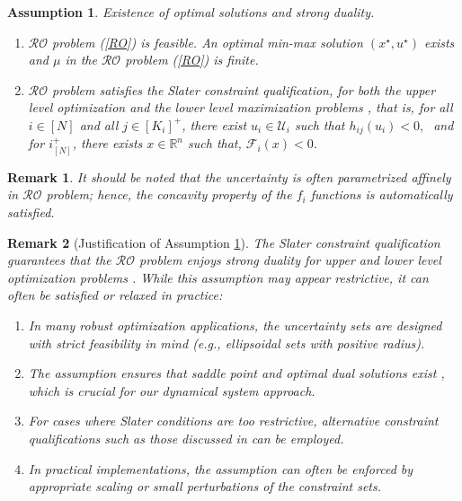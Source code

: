 \documentclass[journal,twoside,web]{ieeecolor}
\newcommand{\rev}[1]{\textcolor{revisionblue}{#1}}
\newtheorem{assumption}[theorem]{Assumption}
\newtheorem{remark}{Remark}
\begin{document}
\begin{assumption} \label{assume_feasible} Existence of optimal solutions and strong duality.

\begin{enumerate}
\item $\mathcal{RO}$ problem (\ref{RO}) is feasible. An optimal min-max solution $(x^\star,u^\star)$ exists and $\mu$ in the $\mathcal{RO}$ problem (\ref{RO}) is finite.
\item $\mathcal{RO}$ problem satisfies the Slater constraint qualification, for both the upper level optimization and the lower level maximization problems
 \cite{bental2009-2}, that is,
for all $i\in[N]$ and all $j\in[K_i]^+$, there exist $u_i \in \mathcal{U}_i$ such that $h_{ij}(u_i)<0,\;$  and
for $i^+_{[N]}$,  there exists $x \in \mathbb{R}^n$ such that, $\mathcal{F}_i(x)<0$\;.
\end{enumerate}
\end{assumption}
\begin{remark}
    It should be noted that the uncertainty is often parametrized affinely in $\mathcal{RO}$ problem; hence, the concavity property of the $f_i$ functions is automatically satisfied.
\end{remark}
\begin{remark}[\rev{Justification of Assumption \ref{assume_feasible}}] \label{strong_duality_rem}
\rev{The Slater constraint qualification guarantees that the $\mathcal{RO}$ problem enjoys strong duality for upper and lower level optimization problems \cite[Section~5.2.3, 5.9.1]{boyd2004}. While this assumption may appear restrictive, it can often be satisfied or relaxed in practice:}
\begin{enumerate}
\item \rev{In many robust optimization applications, the uncertainty sets are designed with strict feasibility in mind (e.g., ellipsoidal sets with positive radius).}
\item \rev{The assumption ensures that saddle point and optimal dual solutions exist \cite{bental2009-2}, which is crucial for our dynamical system approach.}
\item \rev{For cases where Slater conditions are too restrictive, alternative constraint qualifications such as those discussed in \cite{jeyakumar2010} can be employed.}
\item \rev{In practical implementations, the assumption can often be enforced by appropriate scaling or small perturbations of the constraint sets.}
\end{enumerate}
\end{remark}
\end{document}

